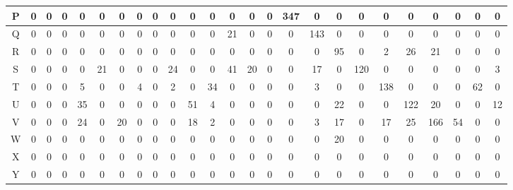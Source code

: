 \documentclass[times,final,english]{revdetua}
\begin{document}
\begin{table}[ht]
\begin{tabular}{|c|c|c|c|c|c|c|c|c|c|c|c|c|c|c|c|c|c|c|c|c|c|c|c|c|}
P & 0 & 0 & 0 & 0 & 0 & 0 & 0 & 0 & 0 & 0 & 0 & 0 & 0 & 0 & 347 & 0 & 0 & 0 & 0 & 0 & 0 & 0 & 0 & 0 \\ \hline
Q & 0 & 0 & 0 & 0 & 0 & 0 & 0 & 0 & 0 & 0 & 0 & 21 & 0 & 0 & 0 & 143 & 0 & 0 & 0 & 0 & 0 & 0 & 0 & 0 \\ \hline
R & 0 & 0 & 0 & 0 & 0 & 0 & 0 & 0 & 0 & 0 & 0 & 0 & 0 & 0 & 0 & 0 & 95 & 0 & 2 & 26 & 21 & 0 & 0 & 0 \\ \hline
S & 0 & 0 & 0 & 0 & 21 & 0 & 0 & 0 & 24 & 0 & 0 & 41 & 20 & 0 & 0 & 17 & 0 & 120 & 0 & 0 & 0 & 0 & 0 & 3 \\ \hline
T & 0 & 0 & 0 & 5 & 0 & 0 & 4 & 0 & 2 & 0 & 34 & 0 & 0 & 0 & 0 & 3 & 0 & 0 & 138 & 0 & 0 & 0 & 62 & 0 \\ \hline
U & 0 & 0 & 0 & 35 & 0 & 0 & 0 & 0 & 0 & 51 & 4 & 0 & 0 & 0 & 0 & 0 & 22 & 0 & 0 & 122 & 20 & 0 & 0 & 12 \\ \hline
V & 0 & 0 & 0 & 24 & 0 & 20 & 0 & 0 & 0 & 18 & 2 & 0 & 0 & 0 & 0 & 3 & 17 & 0 & 17 & 25 & 166 & 54 & 0 & 0 \\ \hline
W & 0 & 0 & 0 & 0 & 0 & 0 & 0 & 0 & 0 & 0 & 0 & 0 & 0 & 0 & 0 & 0 & 20 & 0 & 0 & 0 & 0 & 0 & 0 & 0 \\ \hline
X & 0 & 0 & 0 & 0 & 0 & 0 & 0 & 0 & 0 & 0 & 0 & 0 & 0 & 0 & 0 & 0 & 0 & 0 & 0 & 0 & 0 & 0 & 0 & 0 \\ \hline
Y & 0 & 0 & 0 & 0 & 0 & 0 & 0 & 0 & 0 & 0 & 0 & 0 & 0 & 0 & 0 & 0 & 0 & 0 & 0 & 0 & 0 & 0 & 0 & 0 \\ \hline
\end{tabular}
\end{table}
\end{document}
